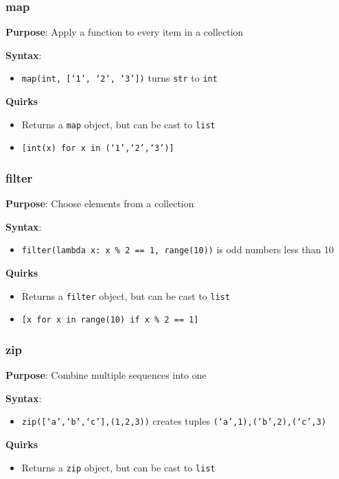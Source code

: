 \documentclass{beamer}
\begin{document}
\begin{frame}
  \frametitle{map}

  \textbf{Purpose}: Apply a function to every item in a collection

  \textbf{Syntax}: 
  \begin{itemize}
    \item \texttt{map(int, [`1', `2', `3'])} turns \texttt{str} to \texttt{int}
  \end{itemize}

  \textbf{Quirks}
  \begin{itemize}
    \item Returns a \texttt{map} object, but can be cast to \texttt{list}
    \item \texttt{[int(x) for x in (`1',`2',`3')]}
  \end{itemize}
\end{frame}

\begin{frame}
  \frametitle{filter}

  \textbf{Purpose}: Choose elements from a collection

  \textbf{Syntax}: 
  \begin{itemize}
    \item \texttt{filter(lambda x: x \% 2 == 1, range(10))} is odd numbers less than 10
  \end{itemize}

  \textbf{Quirks}
  \begin{itemize}
    \item Returns a \texttt{filter} object, but can be cast to \texttt{list}
    \item \texttt{[x for x in range(10) if x \% 2 == 1]}
   \end{itemize}
\end{frame}

\begin{frame}
  \frametitle{zip}

  \textbf{Purpose}: Combine multiple sequences into one

  \textbf{Syntax}: 
  \begin{itemize}
    \item \texttt{zip([`a',`b',`c'],(1,2,3))} creates tuples \texttt{(`a',1),(`b',2),(`c',3)}
  \end{itemize}

  \textbf{Quirks}
  \begin{itemize}
    \item Returns a \texttt{zip} object, but can be cast to \texttt{list}
  \end{itemize}
\end{frame}
\end{document}
